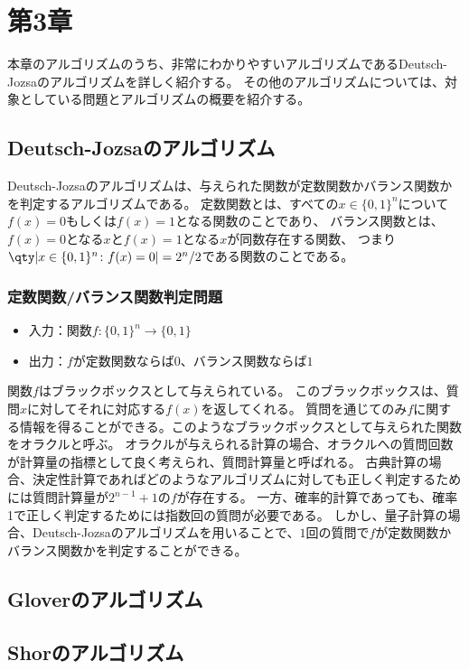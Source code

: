 \documentclass[a4paper,11pt,uplatex]{jsarticle}%
\begin{document}
\newpage
\section{第3章}
本章のアルゴリズムのうち、非常にわかりやすいアルゴリズムであるDeutsch-Jozsaのアルゴリズムを詳しく紹介する。
その他のアルゴリズムについては、対象としている問題とアルゴリズムの概要を紹介する。
\subsection{Deutsch-Jozsaのアルゴリズム}
Deutsch-Jozsaのアルゴリズムは、与えられた関数が定数関数かバランス関数かを判定するアルゴリズムである。
定数関数とは、すべての$x\in\{0,1\}^n$について$f(x)=0$もしくは$f(x)=1$となる関数のことであり、
バランス関数とは、$f(x)=0$となる$x$と$f(x)=1$となる$x$が同数存在する関数、
つまり$\qty|x\in\{0,1\}^{n}\colon f(x)=0|=2^n/2$である関数のことである。

\subsubsection*{定数関数/バランス関数判定問題}
\begin{itemize}
  \item 入力：関数$f\colon\{0,1\}^n\to\{0,1\}$
  \item 出力：$f$が定数関数ならば$0$、バランス関数ならば$1$
\end{itemize}
関数$f$はブラックボックスとして与えられている。
このブラックボックスは、質問$x$に対してそれに対応する$f(x)$を返してくれる。
質問を通じてのみ$f$に関する情報を得ることができる。このようなブラックボックスとして与えられた関数をオラクルと呼ぶ。
オラクルが与えられる計算の場合、オラクルへの質問回数が計算量の指標として良く考えられ、質問計算量と呼ばれる。
古典計算の場合、決定性計算であればどのようなアルゴリズムに対しても正しく判定するためには質問計算量が$2^{n-1}+1$の$f$が存在する。
一方、確率的計算であっても、確率1で正しく判定するためには指数回の質問が必要である。
しかし、量子計算の場合、Deutsch-Jozsaのアルゴリズムを用いることで、$1$回の質問で$f$が定数関数かバランス関数かを判定することができる。





\subsection{Gloverのアルゴリズム}
\subsection{Shorのアルゴリズム}
\end{document}
